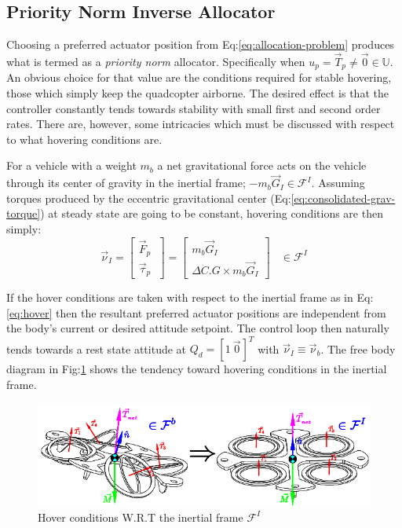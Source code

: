 \subsection{Priority Norm Inverse Allocator}
\label{subsec:allocation.allocators.norminverse}
Choosing a preferred actuator position from Eq:\ref{eq:allocation-problem} produces what is termed as a \emph{priority norm} allocator. Specifically when $u_p=\vec{T}_p\not=\vec{0}\in\mathbb{U}$. An obvious choice for that value are the conditions required for stable hovering, those which simply keep the quadcopter airborne. The desired effect is that the controller constantly tends towards stability with small first and second order rates. There are, however, some intricacies which must be discussed with respect to what hovering conditions are.
\par
For a vehicle with a weight $m_b$ a net gravitational force acts on the vehicle through its center of gravity in the inertial frame; $-m_b\vec{G}_I\in\mathcal{F}^I$. Assuming torques produced by the eccentric gravitational center (Eq:\ref{eq:consolidated-grav-torque}) at steady state are going to be constant, hovering conditions are then simply:
\begin{equation}\label{eq:hover}
\vec{\nu}_I=
\begin{bmatrix}
\vec{F}_p\hspace{3pt}\\
\vec{\tau}_p\hspace{3pt}
\end{bmatrix}
=
\begin{bmatrix}
m_b\vec{G}_I\hspace{3pt}\\
\Delta C.G \times m_b\vec{G}_I
\end{bmatrix}~~~~\in\mathcal{F}^I
\end{equation}
\par
If the hover conditions are taken with respect to the inertial frame as in Eq:\ref{eq:hover} then the resultant preferred actuator positions are independent from the body's current or desired attitude setpoint. The control loop then naturally tends towards a rest state attitude at $Q_d=[1~\vec{0}\hspace{1pt}]^T$ with $\vec{\nu}_I\equiv\vec{\nu}_b$. The free body diagram in Fig:\ref{fig:hover-inertial} shows the tendency toward hovering conditions in the inertial frame.
\begin{figure}[htbp]
\centering
\includegraphics[width=\textwidth]{figs/hover-inertial}
\caption{Hover conditions W.R.T the inertial frame $\mathcal{F}^I$}
\label{fig:hover-inertial}
\vspace{-20pt}
\end{figure}
